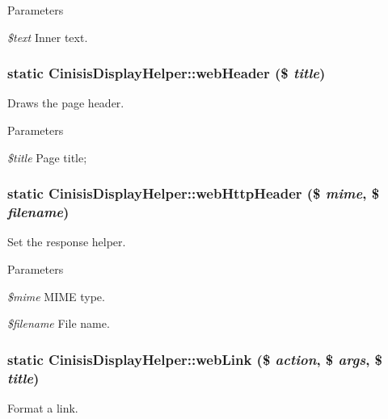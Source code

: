 \begin{DoxyParams}{Parameters}
\item[{\em \$text}]Inner text. \end{DoxyParams}
\hypertarget{classCinisisDisplayHelper_a356d8117dfcb220b7bb9996b569f5f25}{
\subsubsection[{webHeader}]{\setlength{\rightskip}{0pt plus 5cm}static CinisisDisplayHelper::webHeader (\$ {\em title})}}
\label{classCinisisDisplayHelper_a356d8117dfcb220b7bb9996b569f5f25}
Draws the page header.


\begin{DoxyParams}{Parameters}
\item[{\em \$title}]Page title; \end{DoxyParams}
\hypertarget{classCinisisDisplayHelper_a6629bfa4b0ccd26d1433ca2302ce8c41}{
\subsubsection[{webHttpHeader}]{\setlength{\rightskip}{0pt plus 5cm}static CinisisDisplayHelper::webHttpHeader (\$ {\em mime}, \/  \$ {\em filename})}}
\label{classCinisisDisplayHelper_a6629bfa4b0ccd26d1433ca2302ce8c41}
Set the response helper.


\begin{DoxyParams}{Parameters}
\item[{\em \$mime}]MIME type.\item[{\em \$filename}]File name. \end{DoxyParams}
\hypertarget{classCinisisDisplayHelper_aadc869909d8be43402d73fa3415827b4}{
\subsubsection[{webLink}]{\setlength{\rightskip}{0pt plus 5cm}static CinisisDisplayHelper::webLink (\$ {\em action}, \/  \$ {\em args}, \/  \$ {\em title})}}
\label{classCinisisDisplayHelper_aadc869909d8be43402d73fa3415827b4}
Format a link.


